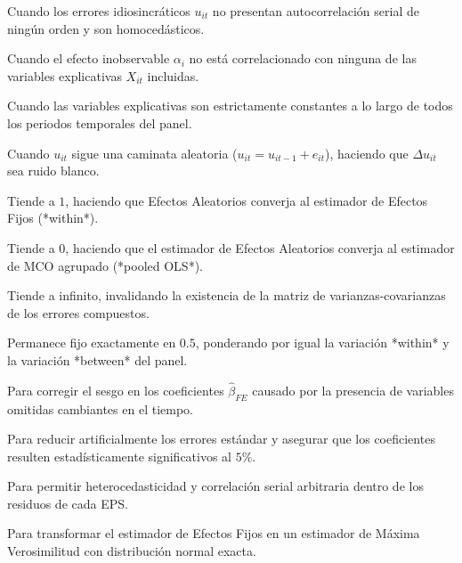\begin{opts}
    \item Cuando los errores idiosincráticos $u_{it}$ no presentan autocorrelación serial de ningún orden y son homocedásticos.
    \item Cuando el efecto inobservable $\alpha_i$ no está correlacionado con ninguna de las variables explicativas $X_{it}$ incluidas.
    \item Cuando las variables explicativas son estrictamente constantes a lo largo de todos los periodos temporales del panel.
    \item Cuando $u_{it}$ sigue una caminata aleatoria ($u_{it} = u_{it-1} + e_{it}$), haciendo que $\Delta u_{it}$ sea ruido blanco.
\end{opts}

\begin{opts}
    \item Tiende a $1$, haciendo que Efectos Aleatorios converja al estimador de Efectos Fijos (*within*).
    \item Tiende a $0$, haciendo que el estimador de Efectos Aleatorios converja al estimador de MCO agrupado (*pooled OLS*).
    \item Tiende a infinito, invalidando la existencia de la matriz de varianzas-covarianzas de los errores compuestos.
    \item Permanece fijo exactamente en $0.5$, ponderando por igual la variación *within* y la variación *between* del panel.
\end{opts}

\begin{opts}
    \item Para corregir el sesgo en los coeficientes $\hat{\beta}_{FE}$ causado por la presencia de variables omitidas cambiantes en el tiempo.
    \item Para reducir artificialmente los errores estándar y asegurar que los coeficientes resulten estadísticamente significativos al $5\%$.
    \item Para permitir heterocedasticidad y correlación serial arbitraria dentro de los residuos de cada EPS.
    \item Para transformar el estimador de Efectos Fijos en un estimador de Máxima Verosimilitud con distribución normal exacta.
\end{opts}

